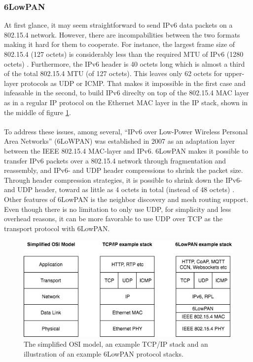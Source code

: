 
\subsubsection{6LowPAN}

At first glance, it may seem straightforward to send IPv6 data packets on a 802.15.4 network. However, there are incompabilities between the two formats making it hard for them to cooperate. For instance, the largest frame size of 802.15.4 (127 octets) is considerably less than the required MTU of IPv6 (1280 octets) \cite{rfc4944}. Furthermore, the IPv6 header is 40 octets long which is almost a third of the total 802.15.4 MTU (of 127 octets). This leaves only 62 octets for upper-layer protocols as UDP or ICMP. That makes it impossible in the first case and infeasable in the second, to build IPv6 direclty on top of the 802.15.4 MAC layer as in a regular IP protocol on the Ethernet MAC layer in the IP stack, shown in the middle of figure \ref{fig:ip-6lowpan-stack}.\\\\
To address these issues, among several, ``IPv6 over Low-Power Wireless Personal Area Networks'' (6LoWPAN) was established in 2007 as an adaptation layer between the IEEE 802.15.4 MAC-layer and IPv6. 6LowPAN makes it possible to transfer IPv6 packets over a 802.15.4 network through fragmentation and reassembly, and IPv6- and UDP header compressions to shrink the packet size. Through header compression strategies, it is possible to shrink down the IPv6- and UDP header, toward as little as 4 octets in total (instead of 48 octets) \cite{rfc4944}. Other features of 6LowPAN is the neighbor discovery and mesh routing support. Even though there is no limitation to only use UDP, for simplicity and less overhead reasons, it can be more favorable to use UDP over TCP as the transport protocol with 6LowPAN.




\begin{figure}
	\includegraphics[width=\textwidth]{figures/6lowpan-own.png}
	\caption{The simplified OSI model, an example TCP/IP stack and an illustration of an example 6LowPAN protocol stacks.}
	\label{fig:ip-6lowpan-stack}
\end{figure}

